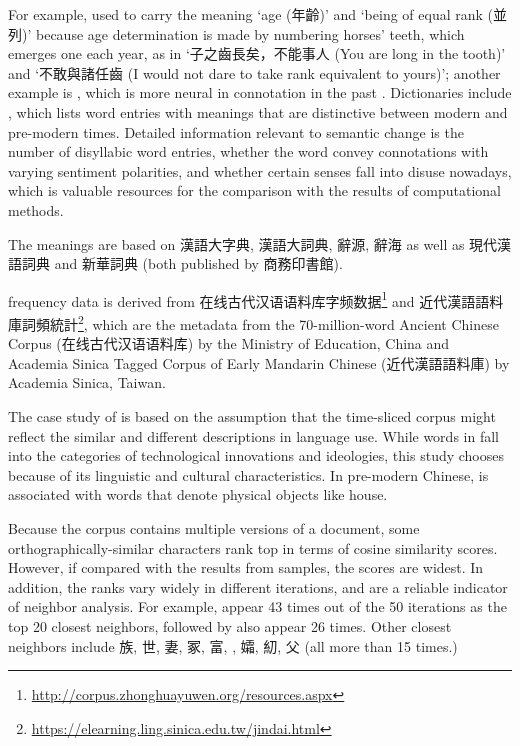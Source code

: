 For example,  used to carry the meaning `age (年齡)' and `being of equal rank (並列)' because age determination is made by numbering horses' teeth, which emerges one each year, as in `子之齒長矣，不能事人 (You are long in the tooth)' and `不敢與諸任齒 (I would not dare to take rank equivalent to yours)'; another example is , which is more neural in connotation in the past \parencite[前言]{wang1997gujinyiyi}. Dictionaries include \textcite{wang1997gujinyiyi,liu1992gujinyi}, which lists word entries with meanings that are distinctive between modern and pre-modern times. Detailed information relevant to semantic change is the number of disyllabic word entries, whether the word convey connotations with varying sentiment polarities, and whether certain senses fall into disuse nowadays, which is valuable resources for the comparison with the results of computational methods. 

The meanings are based on 漢語大字典, 漢語大詞典, 辭源, 辭海 as well as 現代漢語詞典 and 新華詞典 (both published by 商務印書館).

frequency data is derived from 在线古代汉语语料库字频数据\footnote{\url{http://corpus.zhonghuayuwen.org/resources.aspx}} and 近代漢語語料庫詞頻統計\footnote{\url{https://elearning.ling.sinica.edu.tw/jindai.html}}, which are the metadata from the 70-million-word Ancient Chinese Corpus (在线古代汉语语料库) by the Ministry of Education, China and Academia Sinica Tagged Corpus of Early Mandarin Chinese (近代漢語語料庫) by Academia Sinica, Taiwan.

The case study of \jia is based on the assumption that the time-sliced corpus might reflect the similar and different descriptions in language use. While words in  fall into the categories of technological innovations and ideologies, this study chooses \jia because of its linguistic and cultural characteristics. In pre-modern Chinese, \jia is associated with words that denote physical objects like house.

Because the corpus contains multiple versions of a document, some orthographically-similar characters rank top in terms of cosine similarity scores. However, if compared with the results from  samples, the scores are widest. In addition, the ranks vary widely in different iterations, and are a reliable indicator of neighbor analysis. For example,  appear 43 times out of the 50 iterations as the top 20 closest neighbors, followed by  also appear 26 times. Other closest neighbors include 族, 世, 妻, 冢, 富, , 孀, 糿, 父 (all more than 15 times.)


